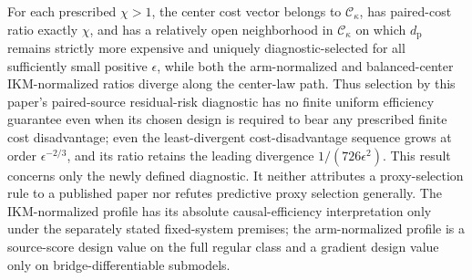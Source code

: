 For each prescribed \(\chi>1\), the center cost vector belongs to \(\mathcal C_\kappa\), has paired-cost ratio exactly \(\chi\), and has a relatively open neighborhood in \(\mathcal C_\kappa\) on which \(d_{\mathrm p}\) remains strictly more expensive and uniquely diagnostic-selected for all sufficiently small positive \(\epsilon\), while both the arm-normalized and balanced-center IKM-normalized ratios diverge along the center-law path. Thus selection by this paper's paired-source residual-risk diagnostic has no finite uniform efficiency guarantee even when its chosen design is required to bear any prescribed finite cost disadvantage; even the least-divergent cost-disadvantage sequence grows at order \(\epsilon^{-2/3}\), and its ratio retains the leading divergence \(1/(726\epsilon^2)\). This result concerns only the newly defined diagnostic. It neither attributes a proxy-selection rule to a published paper nor refutes predictive proxy selection generally. The IKM-normalized profile has its absolute causal-efficiency interpretation only under the separately stated fixed-system premises; the arm-normalized profile is a source-score design value on the full regular class and a gradient design value only on bridge-differentiable submodels.